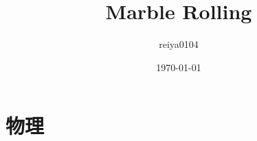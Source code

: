 \documentclass[12pt]{jsarticle}
\title{Marble Rolling}
\author{reiya0104}
\date{\today}
\begin{document}
\maketitle

\section{物理}


\end{document}
